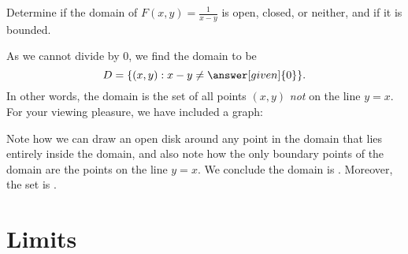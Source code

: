 \documentclass{ximera}
\begin{document}
\begin{example}
\begin{explanation}
\begin{image}
            \end{image}

  \end{explanation}
\end{example}

\begin{example}
  Determine if the domain of $F(x,y) = \frac{1}{x-y}$ is open, closed,
  or neither, and if it is bounded.
  \begin{explanation}
    As we cannot divide by $0$, we find the domain to be
    \[
    D = \{(x,y):x-y\neq \answer[given]{0}\}.
    \]
    In other words, the domain is the set of all points $(x,y)$
    \textit{not} on the line $y=x$. For your viewing pleasure, we have
    included a graph:
    \begin{image}
    \end{image}
    Note how we can draw an open disk around any point in the domain
    that lies entirely inside the domain, and also note how the only
    boundary points of the domain are the points on the line $y=x$. We
    conclude the domain is . Moreover, the set is .
  \end{explanation}
\end{example}

\section{Limits}
\end{document}
